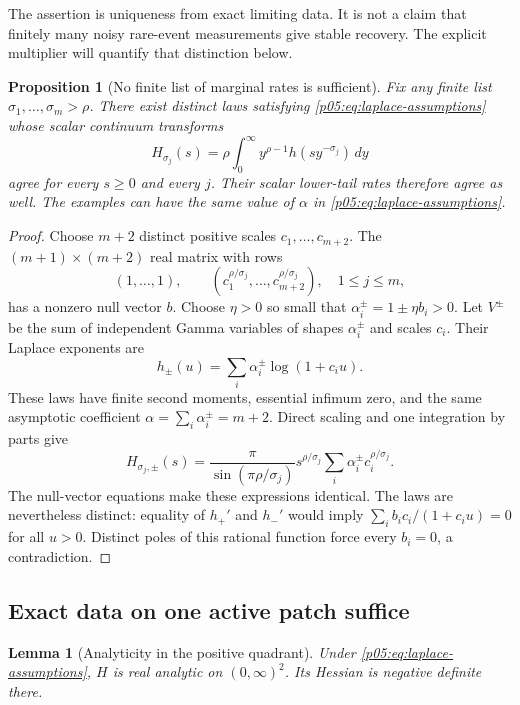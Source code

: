\documentclass[11pt,letterpaper]{article}
\newtheorem{lemma}[theorem]{Lemma}
\newtheorem{proposition}[theorem]{Proposition}
\theoremstyle{definition}
\theoremstyle{remark}
\newcommand{\1}{\mathbf 1}
\begin{document}
The assertion is uniqueness from exact limiting data. It is not a claim
that finitely many noisy rare-event measurements give stable recovery.
The explicit multiplier will quantify that distinction below.

\begin{proposition}[No finite list of marginal rates is sufficient]
\label{p05:prop:marginals-insufficient}
Fix any finite list $\sigma_1,\ldots,\sigma_m>\rho$.
There exist distinct laws satisfying \eqref{p05:eq:laplace-assumptions}
whose scalar continuum transforms
\[
 H_{\sigma_j}(s)=\rho\int_0^\infty
 y^{\rho-1}h(sy^{-\sigma_j})\,dy
\]
agree for every $s\ge0$ and every $j$. Their scalar lower-tail rates
therefore agree as well. The examples can have the same value of
$\alpha$ in \eqref{p05:eq:laplace-assumptions}.
\end{proposition}

\begin{proof}
Choose $m+2$ distinct positive scales $c_1,\ldots,c_{m+2}$.
The $(m+1)\times(m+2)$ real matrix with rows
\[
 (1,\ldots,1),\qquad
 (c_1^{\rho/\sigma_j},\ldots,c_{m+2}^{\rho/\sigma_j}),
 \quad 1\le j\le m,
\]
has a nonzero null vector $b$. Choose $\eta>0$ so small that
$\alpha_i^\pm=1\pm\eta b_i>0$. Let $V^\pm$ be the sum of independent
Gamma variables of shapes $\alpha_i^\pm$ and scales $c_i$.
Their Laplace exponents are
\[
 h_\pm(u)=\sum_i\alpha_i^\pm\log(1+c_i u).
\]
These laws have finite second moments, essential infimum zero, and
the same asymptotic coefficient
$\alpha=\sum_i\alpha_i^\pm=m+2$. Direct scaling and one integration
by parts give
\[
 H_{\sigma_j,\pm}(s)
 =\frac{\pi}{\sin(\pi\rho/\sigma_j)}
 s^{\rho/\sigma_j}\sum_i\alpha_i^\pm c_i^{\rho/\sigma_j}.
\]
The null-vector equations make these expressions identical.
The laws are nevertheless distinct: equality of $h_+'$ and $h_-'$
would imply
$\sum_i b_i c_i/(1+c_i u)=0$ for all $u>0$.
Distinct poles of this rational function force every $b_i=0$, a
contradiction.
\end{proof}

\subsection{Exact data on one active patch suffice}

\begin{lemma}[Analyticity in the positive quadrant]
\label{p05:lem:H-analytic}
Under \eqref{p05:eq:laplace-assumptions}, $H$ is real analytic on
$(0,\infty)^2$. Its Hessian is negative definite there.
\end{lemma}
\end{document}

